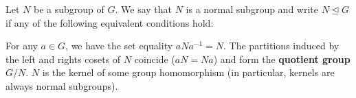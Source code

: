 \begin{definition}\label{def:normal_subgroup}
  Let \( N \) be a subgroup of \( G \). We say that \( N \) is a normal subgroup and write \( N \unlhd G \) if any of the following equivalent conditions hold:
  \begin{defenum}
     For any \( a \in G \), we have the set equality \( a N a^{-1} = N \).
     The partitions induced by the left and rights cosets of \( N \) coincide (\( aN = Na \)) and form the \textbf{quotient group \( G / N \)}.
     \( N \) is the kernel of some group homomorphism (in particular, kernels are always normal subgroups).
  \end{defenum}
\end{definition}
